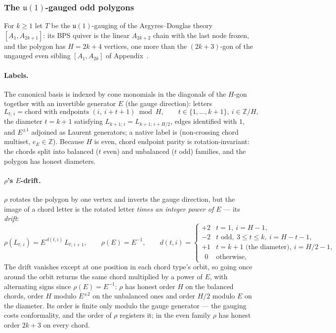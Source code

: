 \documentclass[11pt]{amsart}
\makeatletter
\newcommand\bZ{\mathbb{Z}}
\theoremstyle{remark}
\newcommand{\pref}[1]{\@ifundefined{r@P-#1}{\textup{[\texttt{\detokenize{#1}}]}}{\ref{P-#1}}}
\makeatother
\begin{document}
\subsubsection{The $\mathfrak u(1)$-gauged odd polygons}\label{comp:u1a1aodd}
For $k\ge1$ let $T$ be the $\mathfrak u(1)$-gauging of the
Argyres--Douglas theory $[A_1,A_{2k+1}]$: its BPS quiver is the linear
$A_{2k+2}$ chain with the last node frozen, and the polygon has
$H=2k+4$ vertices, one more than the $(2k+3)$-gon of the ungauged even
sibling $[A_1,A_{2k}]$ of Appendix~\pref{app:a1a2k}.

\paragraph{Labels.}  The canonical basis is indexed by cone monomials in
the diagonals of the $H$-gon together with an invertible generator $E$
(the gauge direction): letters
\begin{equation}
  L_{t;\,i} = \text{chord with endpoints }(i,\ i+t+1)\bmod H,
  \qquad t\in\{1,\dots,k+1\},\ i\in\bZ/H,
\end{equation}
the diameter $t=k+1$ satisfying $L_{k+1;\,i}=L_{k+1;\,i+H/2}$, edges
identified with $1$, and $E^{\pm1}$ adjoined as Laurent generators; a
native label is (non-crossing chord multiset, $e_E\in\bZ$).  Because $H$
is even, chord endpoint parity is rotation-invariant: the chords split
into balanced ($t$ even) and unbalanced ($t$ odd) families, and the
polygon has honest diameters.

\paragraph{$\rho$'s $E$-drift.}  $\rho$ rotates the polygon by one vertex
and inverts the gauge direction, but the image of a chord letter is the
rotated letter \emph{times an integer power of $E$} --- its \emph{drift}:
\begin{equation}\label{eq:comp-drift}
  \rho(L_{t;\,i}) = E^{\,d(t,i)}\,L_{t;\,i+1},\qquad \rho(E)=E^{-1},
  \qquad
  d(t,i)=\begin{cases}
    +2 & t=1,\ i=H-1,\\
    -2 & t\text{ odd},\ 3\le t\le k,\ i=H-t-1,\\
    +1 & t=k+1\text{ (the diameter)},\ i=H/2-1,\\
    \ \ 0 & \text{otherwise},
  \end{cases}
\end{equation}
The drift vanishes except at one position in each chord type's orbit, so
going once around the orbit returns the same chord multiplied by a power of
$E$, with alternating signs since $\rho(E)=E^{-1}$: $\rho$ has honest order
$H$ on the balanced chords, order $H$ modulo $E^{\pm2}$ on the unbalanced
ones and order $H/2$ modulo $E$ on the diameter.  Its order is finite only
modulo the gauge generator --- the gauging costs conformality, and the order
of $\rho$ registers it; in the even family $\rho$ has honest order $2k+3$ on
every chord.
\end{document}
